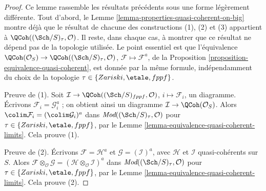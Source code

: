 \begin{proof}
Ce lemme rassemble les résultats précédents sous une forme légèrement
différente. Tout d'abord, le
Lemme \ref{lemma-properties-quasi-coherent-on-big} montre déjà que le
résultat de chacune des constructions (1), (2) et (3) appartient à
$\QCoh((\Sch/S)_\tau, \mathcal{O})$. Il reste, dans chaque cas, à montrer
que ce résultat ne dépend pas de la topologie utilisée. Le point essentiel
est que l'équivalence
$\QCoh(\mathcal{O}_S) \to \QCoh((\Sch/S)_\tau, \mathcal{O})$,
$\mathcal{F} \mapsto \mathcal{F}^a$, de la
Proposition \ref{proposition-equivalence-quasi-coherent}, est donnée par la
même formule, indépendamment du choix de la topologie
$\tau \in \{Zariski, \etale, fppf\}$.

\medskip\noindent
Preuve de (1). Soit
$\mathcal{I} \to \QCoh((\Sch/S)_{fppf}, \mathcal{O})$,
$i \mapsto \mathcal{F}_i$, un diagramme. Écrivons
$\mathcal{F}_i = \mathcal{G}_i^a$ ; on obtient ainsi un diagramme
$\mathcal{I} \to \QCoh(\mathcal{O}_S)$. Alors
$\colim \mathcal{F}_i = (\colim \mathcal{G}_i)^a$ dans
$\textit{Mod}((\Sch/S)_\tau, \mathcal{O})$ pour
$\tau \in \{Zariski, \etale, fppf\}$, par le
Lemme \ref{lemma-equivalence-quasi-coherent-limits}. Cela prouve (1).

\medskip\noindent
Preuve de (2). Écrivons $\mathcal{F} = \mathcal{H}^a$ et
$\mathcal{G} = (\mathcal{I})^a$, avec $\mathcal{H}$ et $\mathcal{I}$
quasi-cohérents sur $S$. Alors
$\mathcal{F} \otimes_\mathcal{O} \mathcal{G} =
(\mathcal{H} \otimes_\mathcal{O} \mathcal{I})^a$ dans
$\textit{Mod}((\Sch/S)_\tau, \mathcal{O})$ pour
$\tau \in \{Zariski, \etale, fppf\}$, par le
Lemme \ref{lemma-equivalence-quasi-coherent-limits}. Cela prouve (2).


\end{proof}
